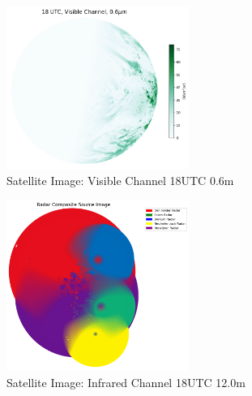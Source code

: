 \documentclass[acmtog, authorversion]{acmart}
\begin{document}
\begin{figure}
    \centering
    \includegraphics[width=225]{report/images/vis_006.png}
    \caption{Satellite Image: Visible Channel 18UTC 0.6\mu m}
    \label{fig:vis}
\end{figure}

\begin{figure}
    \centering
    \includegraphics[width=225]{report/images/radar_source.png}
    \caption{Satellite Image: Infrared Channel 18UTC 12.0\mu m}
    \label{fig:source}
\end{figure}
\end{document}
